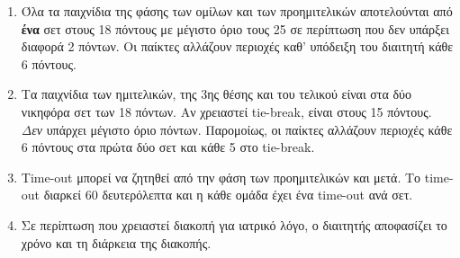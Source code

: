 \documentclass[a4paper,11pt]{article}
\begin{document}
\begin{enumerate}
\item Όλα τα παιχνίδια της φάσης των ομίλων και των προημιτελικών αποτελούνται
  από \textbf{ένα} σετ στους 18 πόντους με μέγιστο όριο τους 25 σε περίπτωση που
  δεν υπάρξει διαφορά 2 πόντων. Οι παίκτες αλλάζουν περιοχές καθ' υπόδειξη του
  διαιτητή κάθε 6 πόντους.

\item Τα παιχνίδια των ημιτελικών, της 3ης θέσης και του τελικού είναι στα δύο
  νικηφόρα σετ των 18 πόντων. Αν χρειαστεί tie-break, είναι στους 15 πόντους.
  \textit{Δεν} υπάρχει μέγιστο όριο πόντων. Παρομοίως, οι παίκτες αλλάζουν
  περιοχές κάθε 6 πόντους στα πρώτα δύο σετ και κάθε 5 στο tie-break.







\item Time-out μπορεί να ζητηθεί από την φάση των προημιτελικών και μετά. Το
  time-out διαρκεί 60 δευτερόλεπτα και η κάθε ομάδα έχει ένα time-out ανά σετ.

\item Σε περίπτωση που χρειαστεί διακοπή για ιατρικό λόγο, ο διαιτητής
  αποφασίζει το χρόνο και τη διάρκεια της διακοπής.


\end{enumerate}
\end{document}
